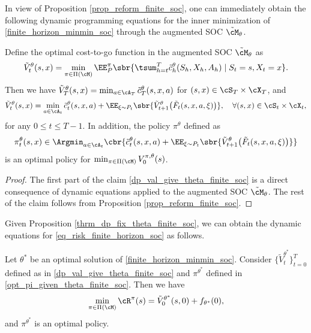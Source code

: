 \documentclass[9pt]{article}
\numberwithin{equation}{section}
\begin{document}
In view of Proposition \ref{prop_reform_finite_soc}, one can immediately obtain the following dynamic programming equations for the inner minimization of \eqref{finite_horizon_minmin_soc} through the augmented SOC $\tilde{\cM}_\theta$.

\begin{proposition}\label{thrm_dp_fix_theta_finite_soc}
    Define the optimal cost-to-go function in the augmented SOC $\tilde{\cM}_\theta$ as
    \begin{align*}
        \tilde{V}_t^\theta(s,x)
        =
        \min_{\pi \in \Pi(\cM)}
        \EE^\pi_P
        \sbr{
        \tsum_{h=t}^T \tilde{c}_h^\theta(S_h,X_h,A_h)
        \mid S_t=s, X_t=x
        }.
    \end{align*}
    Then we have
    $\tilde{V}_T^\theta(s,x)=\min_{a \in \cA_T}\tilde{c}_T^\theta(s,x,a)$ for $(s,x)\in \cS_T\times \cX_T$, and
    \begin{align}\label{dp_val_give_theta_finite_soc}
        \tilde{V}_t^\theta(s,x)
        =
        \min_{a \in \cA_t}
        \tilde{c}_t^\theta(s,x,a)
        +
        \EE_{\xi \sim P_t}
        \sbr{
        \tilde{V}_{t+1}^\theta\bigl(\tilde{F}_t(s,x,a,\xi)\bigr)
        },
        \quad \forall (s,x)\in \cS_t \times \cX_t,
    \end{align}
    for any $0 \leq t \leq T-1$.
    In addition, the policy $\pi^\theta$ defined as
    \begin{align}\label{opt_pi_given_theta_finite_soc}
        \pi^\theta_t(s,x)
        \in
        \Argmin_{a \in \cA_t}
        \cbr{
        \tilde{c}_t^\theta(s,x,a)
        +
        \EE_{\xi \sim P_t}
        \sbr{
        \tilde{V}_{t+1}^\theta\bigl(\tilde{F}_t(s,x,a,\xi)\bigr)
        }}
    \end{align}
    is an optimal policy for $\min_{\pi \in \Pi(\cM)} V^{\pi,\theta}_0(s)$.
\end{proposition}

\begin{proof}
    The first part of the claim \eqref{dp_val_give_theta_finite_soc} is a direct consequence of dynamic equations applied to the augmented SOC $\tilde{\cM}_\theta$. 
    The rest of the claim follows from Proposition \ref{prop_reform_finite_soc}.
\end{proof}

Given Proposition \ref{thrm_dp_fix_theta_finite_soc}, we can obtain the dynamic equations for \eqref{eq_risk_finite_horizon_soc} as follows.

\begin{theorem}\label{cor_dp_optimal_value_finite_soc}
Let $\theta^*$ be an optimal solution of \eqref{finite_horizon_minmin_soc}.
Consider $\{\tilde{V}^{\theta^*}_t\}_{t=0}^T$ defined as in \eqref{dp_val_give_theta_finite_soc}
and $\pi^{\theta^*}$ defined in \eqref{opt_pi_given_theta_finite_soc}. 
Then we have
\begin{align*}
    \min_{\pi \in \Pi(\cM)} \cR^\pi(s)
    =
    \tilde{V}^{\theta^*}_0(s,0) + f_{\theta^*}(0),
\end{align*}
and $\pi^{\theta^*}$ is an optimal policy.
\end{theorem}
\end{document}
